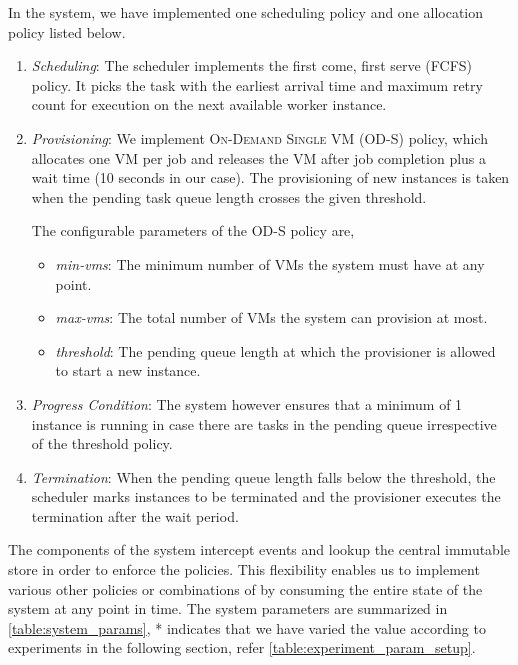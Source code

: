 \documentclass[a4paper]{IEEEtran}
\begin{document}
In the system, we have implemented one scheduling policy and one allocation policy listed below.

\begin{enumerate}
  \item \emph{Scheduling}: The scheduler implements the first come, first serve (FCFS) policy.
  It picks the task with the earliest arrival time and maximum retry count for execution on the next available
  worker instance.

  \item \emph{Provisioning}: We implement \textsc{On-Demand Single VM (OD-S)} policy, which allocates 
  one VM per job and releases the VM after job completion plus a wait time (10 seconds in our case). The provisioning
  of new instances is taken when the pending task queue length crosses the given threshold.

  The configurable parameters of the OD-S policy are,
    \begin{itemize}
      \item \emph{min-vms}: The minimum number of VMs the system must have at any point.
      \item \emph{max-vms}: The total number of VMs the system can provision at most.
      \item \emph{threshold}: The pending queue length at which the provisioner is allowed to start a new instance. 
    \end{itemize} 

  \item \emph{Progress Condition}: The system however ensures that a minimum of 1 instance is running in case there are 
  tasks in the pending queue irrespective of the threshold policy. 

  \item \emph{Termination}: When the pending queue length falls below the threshold, the scheduler marks instances to be
  terminated and the provisioner executes the termination after the wait period.
\end{enumerate}

The components of the system intercept events and lookup the central immutable store in order to enforce the policies. 
This flexibility enables us to implement various other policies or combinations of by consuming the entire state of the 
system at any point in time. The system parameters are summarized in \autoref{table:system_params}, * indicates
that we have varied the value according to experiments in the following section, refer \autoref{table:experiment_param_setup}.
\end{document}
